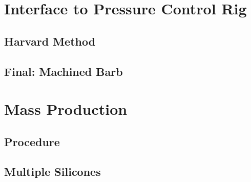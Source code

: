 \section{Interface to Pressure Control Rig}
\subsection{Harvard Method}
\subsection{Final: Machined Barb}

\section{Mass Production}
\subsection{Procedure}
\subsection{Multiple Silicones}
